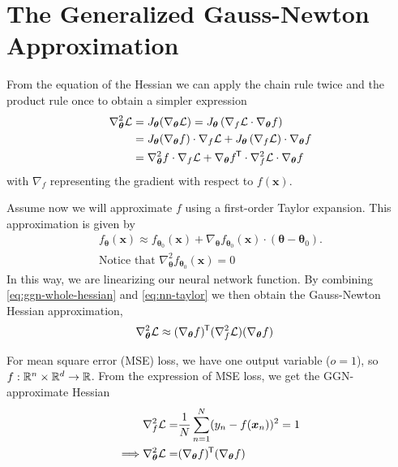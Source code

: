 \section{The Generalized Gauss-Newton Approximation}

From the equation of the Hessian we can apply the chain rule twice and the product rule once to obtain a simpler expression
%
\begin{align}\label{eq:ggn-whole-hessian}
    \nabla^2_{\bm \theta} \mathcal{L}
    ={} & J_{\bm \theta}(\nabla_{\bm \theta} \mathcal{L})
    = J_{\bm \theta}\left(\nabla_f \mathcal{L} \cdot \nabla_{\bm \theta} f\right) \nonumber
    \\ ={}& J_{\bm \theta} (\nabla_{\bm \theta} f) \cdot \nabla_f \mathcal{L} + J_{\bm \theta} \left(\nabla_f \mathcal{L}\right) \cdot \nabla_{\bm \theta} f \nonumber
    \\ ={}& \nabla^2_{\bm \theta} f \cdot \nabla_f \mathcal{L} + \nabla_{\bm \theta} f ^{\mkern-1.5mu\mathsf{T}} \cdot \nabla^2_f \mathcal{L} \cdot \nabla_{\bm \theta} f
\end{align}
with \(\nabla_f\) representing the gradient with respect to \(f(\bm x)\).

Assume now we will approximate \(f\) using a first-order Taylor expansion.
This approximation is given by
%
\begin{align}\label{eq:nn-taylor}
    f_{\bm \theta}(\bm x) \approx{} f_{\bm \theta_0}(\bm x) + \nabla_{\bm \theta} f_{\bm \theta_0}(\bm x) \cdot (\bm \theta - \bm \theta_0) .
    \\ \text{Notice that } \nabla^2_{\bm \theta} f_{\bm \theta_0}(\bm x) = 0 \nonumber
\end{align}
%
In this way, we are linearizing our neural network function.
By combining \cref{eq:ggn-whole-hessian} and \cref{eq:nn-taylor} we then obtain the Gauss-Newton Hessian approximation,
%
\begin{align*}
    \nabla^2_{\bm\theta} \mathcal{L}
    \approx{} & (\nabla_{\bm\theta} f)^{\mkern-1.5mu\mathsf{T}} (\nabla^2_f \mathcal{L}) (\nabla_{\bm\theta} f)
\end{align*}

For mean square error (MSE) loss, we have one output variable (\(o = 1\)), so \(f: \mathbb{R}^n \times \mathbb{R}^d \rightarrow \mathbb{R}\).
From the expression of MSE loss, we get the GGN-approximate Hessian
%
\begin{align*}%
    \nabla^2_{f} \mathcal{L} = & {} \frac{1}{N} \sum_{n=1}^N (y_n - f(\bm x_n))^2 = 1 \nonumber
    \\ \Longrightarrow \nabla^2_{\bm\theta} \mathcal{L} =&{} (\nabla_{\bm\theta} f)\T (\nabla_{\bm\theta} f)
\end{align*}

